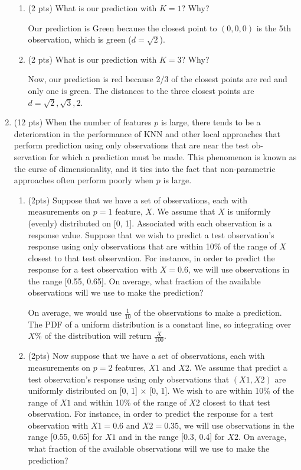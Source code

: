 \documentclass[a4paper]{article}
\theoremstyle{definition}
\newenvironment{soln}{
    \leavevmode\color{blue}\ignorespaces
}{}
\begin{document}
\begin{enumerate}
\begin{enumerate}
	\item (2 pts) What is our prediction with $K=1$? Why?
	
	\begin{soln}
		Our prediction is Green because the closest point to $(0,0,0)$ is the 5th observation, which is green ($d=\sqrt{2}$).
	\end{soln}
	
	\item (2 pts) What is our prediction with $K=3$? Why?
	
	\begin{soln}
		Now, our prediction is red because 2/3 of the closest points are red and only one is green.
		The distances to the three closest points are $d = \sqrt{2}, \sqrt{3}, 2$.
	\end{soln}

\end{enumerate}

\item (12 pts) When the number of features $p$ is large, there tends to be a deterioration in the performance of KNN and other local approaches that perform prediction using only observations that are near the test ob- servation for which a prediction must be made. This phenomenon is known as the curse of dimensionality, and it ties into the fact that non-parametric approaches often perform poorly when $p$ is large.

\begin{enumerate}
	\item (2pts) Suppose that we have a set of observations, each with measurements on $p=1$ feature, $X$. We assume that $X$ is uniformly (evenly) distributed on [0, 1]. Associated with each observation is a response value. Suppose that we wish to predict a test observation’s response using only observations that are within 10\% of the range of $X$ closest to that test observation. For instance, in order to predict the response for a test observation with $X=0.6$, we will use observations in the range [0.55, 0.65]. On average, what fraction of the available observations will we use to make the prediction?
	
	\begin{soln}
		On average, we would use $\frac{1}{10}$ of the observations to make a prediction.
		The PDF of a uniform distribution is a constant line, so integrating over $X\%$ of the distribution will return $\frac{X}{100}$.
	\end{soln}
	
	
	\item (2pts) Now suppose that we have a set of observations, each with measurements on $p =2$ features, $X1$ and $X2$. We assume that predict a test observation’s response using only observations that $(X1,X2)$ are uniformly distributed on [0, 1] × [0, 1]. We wish to are within 10\% of the range of $X1$ and within 10\% of the range of $X2$ closest to that test observation. For instance, in order to predict the response for a test observation with $X1 =0.6$ and $X2 =0.35$, we will use observations in the range [0.55, 0.65] for $X1$ and in the range [0.3, 0.4] for $X2$. On average, what fraction of the available observations will we use to make the prediction?
	

\end{enumerate}
\end{enumerate}
\end{document}
